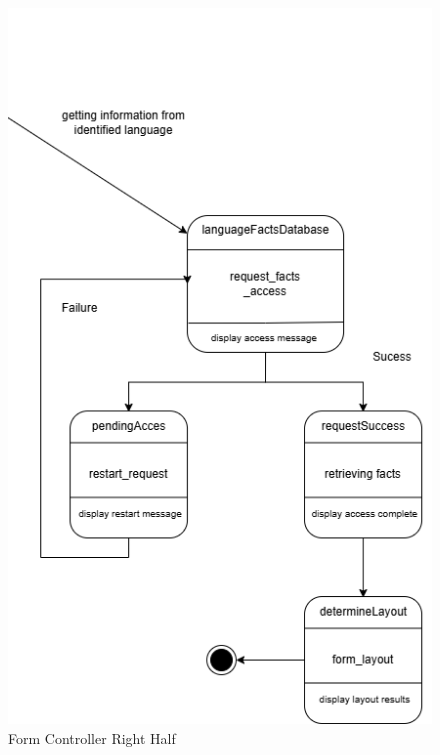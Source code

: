 \begin{figure}[H]
	\centering
	\includegraphics[width=\textwidth, height=0.95\textheight, keepaspectratio]{Section2/images/Form_Controller_state_diagramV2_right_half.png}
	\caption{Form Controller Right Half}
	\label{FormController}
\end{figure}